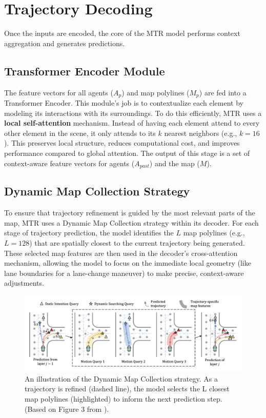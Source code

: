 \section{Trajectory Decoding}
\label{sec:model_decoding}
Once the inputs are encoded, the core of the MTR model performs context aggregation and generates predictions.

\subsection{Transformer Encoder Module}
The feature vectors for all agents ($A_p$) and map polylines ($M_p$) are fed into a Transformer Encoder. This module's job is to contextualize each element by modeling its interactions with its surroundings. To do this efficiently, MTR uses a \textbf{local self-attention} mechanism. Instead of having each element attend to every other element in the scene, it only attends to its $k$ nearest neighbors (e.g., $k=16$). This preserves local structure, reduces computational cost, and improves performance compared to global attention. The output of this stage is a set of context-aware feature vectors for agents ($A_{past}$) and the map ($M$).

\subsection{Dynamic Map Collection Strategy}
\label{subsec:dynamic_map_collection_strategy}
To ensure that trajectory refinement is guided by the most relevant parts of the map, MTR uses a Dynamic Map Collection strategy within its decoder. For each stage of trajectory prediction, the model identifies the $L$ map polylines (e.g., $L=128$) that are spatially closest to the current trajectory being generated. These selected map features are then used in the decoder's cross-attention mechanism, allowing the model to focus on the immediate local geometry (like lane boundaries for a lane-change maneuver) to make precise, context-aware adjustments.

\begin{figure}[htbp]
    \centering
    \includegraphics[width=\textwidth]{figures/dynamic_map.png}
    \caption{An illustration of the Dynamic Map Collection strategy. As a trajectory is refined (dashed line), the model selects the L closest map polylines (highlighted) to inform the next prediction step. (Based on Figure 3 from \cite{Shi2022MTR}).}
    \label{fig:dynamic_map}
\end{figure}

